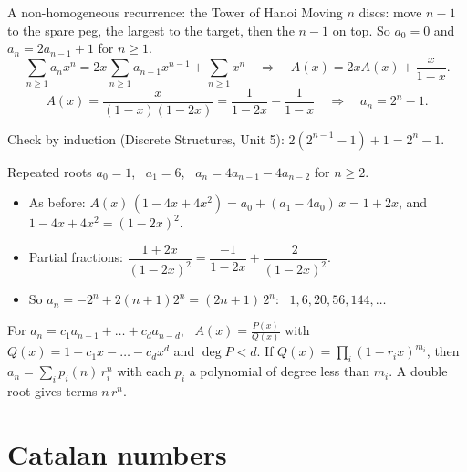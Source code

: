 \documentclass{wosm-slides}
\begin{document}
\begin{frame}{A non-homogeneous recurrence: the Tower of Hanoi}
  Moving $n$ discs: move $n - 1$ to the spare peg, the largest to the target, then the $n - 1$
  on top. So $a_0 = 0$ and $a_n = 2a_{n-1} + 1$ for $n \ge 1$.
  \pause
  \[ \sum_{n \ge 1} a_n x^n = 2x \sum_{n \ge 1} a_{n-1} x^{n-1} + \sum_{n \ge 1} x^n
     \quad\Longrightarrow\quad A(x) = 2x A(x) + \frac{x}{1-x} . \]
  \pause
  \[ A(x) = \frac{x}{(1 - x)(1 - 2x)} = \frac{1}{1 - 2x} - \frac{1}{1 - x}
     \quad\Longrightarrow\quad a_n = 2^n - 1 . \]
  {\small Check by induction (Discrete Structures, Unit 5):
  $2(2^{n-1} - 1) + 1 = 2^n - 1$.\par}
\end{frame}

\begin{frame}{Repeated roots}
  $a_0 = 1$, \ $a_1 = 6$, \ $a_n = 4a_{n-1} - 4a_{n-2}$ for $n \ge 2$.
  \pause
  \begin{itemize}
    \item As before: $A(x)\,(1 - 4x + 4x^2) = a_0 + (a_1 - 4a_0)\,x = 1 + 2x$, and
      $1 - 4x + 4x^2 = (1 - 2x)^2$.
    \item Partial fractions:
      $\dfrac{1 + 2x}{(1 - 2x)^2} = \dfrac{-1}{1 - 2x} + \dfrac{2}{(1 - 2x)^2}$.
    \item So $a_n = -2^n + 2(n + 1) 2^n = (2n + 1)\, 2^n$: \ $1, 6, 20, 56, 144, \dots$
  \end{itemize}
  \pause
  \begin{remark}[In general]
    For $a_n = c_1 a_{n-1} + \dots + c_d a_{n-d}$, \ $A(x) = \frac{P(x)}{Q(x)}$ with
    $Q(x) = 1 - c_1 x - \dots - c_d x^d$ and $\deg P < d$. If
    $Q(x) = \prod_i (1 - r_i x)^{m_i}$, then $a_n = \sum_i p_i(n)\, r_i^n$ with each $p_i$ a
    polynomial of degree less than $m_i$. A double root gives terms $n\, r^n$.
  \end{remark}
\end{frame}

\section{Catalan numbers}
\end{document}
